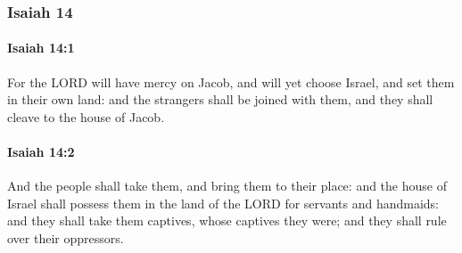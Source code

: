 	\subsubsection{Isaiah 14} %
		\label{ISAIAH-14}

		\paragraph{Isaiah 14:1} %
			\label{ISAIAH-14-1}

			For the LORD will have mercy on Jacob, and will yet choose Israel, and set them in their own land: and the strangers shall be joined with them, and they shall cleave to the house of Jacob.


		\paragraph{Isaiah 14:2} %
			\label{ISAIAH-14-2}

			And the people shall take them, and bring them to their place: and the house of Israel shall possess them in the land of the LORD for servants and handmaids: and they shall take them captives, whose captives they were; and they shall rule over their oppressors.

